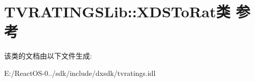 \hypertarget{class_t_v_r_a_t_i_n_g_s_lib_1_1_x_d_s_to_rat}{}\section{T\+V\+R\+A\+T\+I\+N\+G\+S\+Lib\+:\+:X\+D\+S\+To\+Rat类 参考}
\label{class_t_v_r_a_t_i_n_g_s_lib_1_1_x_d_s_to_rat}


该类的文档由以下文件生成\+:\begin{DoxyCompactItemize}
\item 
E\+:/\+React\+O\+S-\/0../sdk/include/dxsdk/tvratings.\+idl\end{DoxyCompactItemize}
